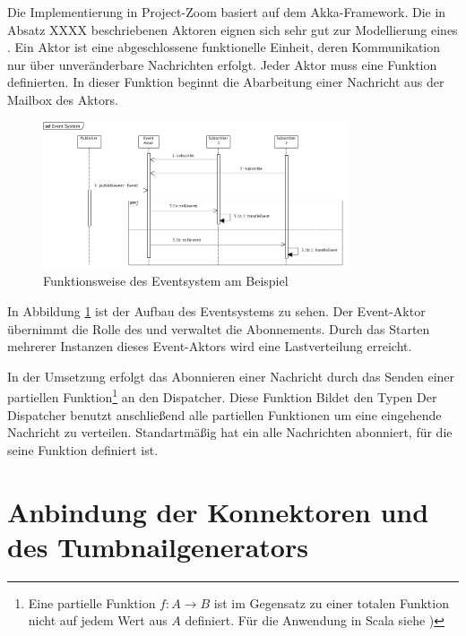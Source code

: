 Die Implementierung in Project-Zoom basiert auf dem Akka-Framework. Die in Absatz XXXX beschriebenen Aktoren eignen sich sehr gut zur Modellierung eines . Ein Aktor ist eine abgeschlossene funktionelle Einheit, deren Kommunikation nur über unveränderbare Nachrichten erfolgt. Jeder Aktor muss eine  Funktion definierten. In dieser Funktion beginnt die Abarbeitung einer Nachricht aus der Mailbox des Aktors. 

\begin{figure}[h]  
  \centering     
  \includegraphics[width=0.8\textwidth]{img/event_system.png}  
   \caption{Funktionsweise des Eventsystem am Beispiel}   
  \label{fig:event-system} 
\end{figure}

In Abbildung \ref{fig:event-system} ist der Aufbau des Eventsystems zu sehen. Der Event-Aktor übernimmt die Rolle des  und verwaltet die Abonnements. Durch das Starten mehrerer Instanzen dieses Event-Aktors wird eine Lastverteilung erreicht.

In der Umsetzung erfolgt das Abonnieren einer Nachricht durch das Senden einer partiellen Funktion\footnote{Eine partielle Funktion $f: A \rightarrow B$ ist im Gegensatz zu einer totalen Funktion nicht auf jedem Wert aus $A$ definiert. Für die Anwendung in Scala siehe \cite{partial-function})} an den Dispatcher. Diese Funktion Bildet den Typen  Der Dispatcher benutzt anschließend alle partiellen Funktionen um eine eingehende Nachricht zu verteilen. Standartmäßig hat ein  alle Nachrichten abonniert, für die seine  Funktion definiert ist.

\section{Anbindung der Konnektoren und des Tumbnailgenerators}
